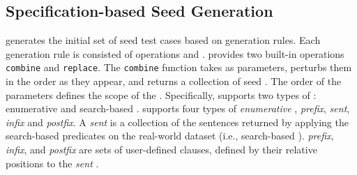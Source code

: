 

\subsection{Specification-based Seed Generation}
\label{sec:seed-gen}


\tool generates the
initial set of seed test cases based on generation rules.
Each generation rule is consisted of operations and \phs.
\tool provides two built-in operations \texttt{combine} and \texttt{replace}.
The \texttt{combine} function takes \phs as parameters, perturbs them in the order as they appear, and returns a collection of seed \sents.
The order of the parameters defines the scope of the \lc.
Specifically,  \tool supports two types of \phs:  enumerative and search-based \phs.
\tool supports four types of \emph{enumerative} \phs, \emph{prefix}, \emph{sent}, \emph{infix} and 
\emph{postfix}.
A \emph{sent} \ph is a collection of the sentences returned by applying the search-based predicates on the real-world dataset (i.e., search-based \phs). 
\emph{prefix}, \emph{infix}, and \emph{postfix} \phs are sets of user-defined clauses, defined by their relative positions to the \emph{sent} \ph.

